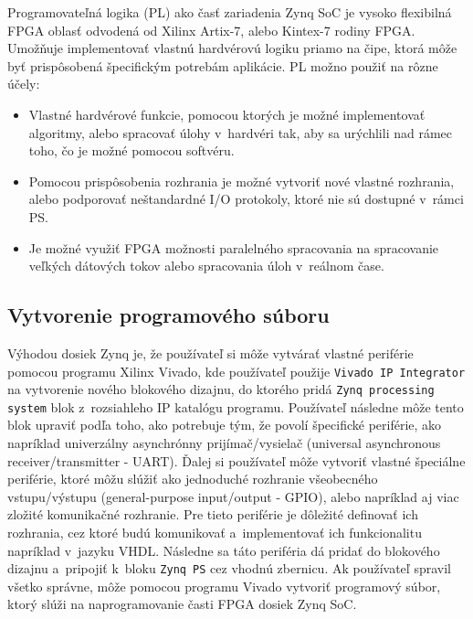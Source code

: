 Programovateľná logika (PL) ako časť zariadenia Zynq SoC je vysoko flexibilná FPGA oblasť odvodená od Xilinx Artix-7, alebo Kintex-7 rodiny FPGA. Umožňuje implementovať vlastnú hardvérovú logiku priamo na čipe, ktorá môže byť prispôsobená špecifickým potrebám aplikácie. PL možno použiť na rôzne účely:

\begin{itemize}
    \item Vlastné hardvérové funkcie, pomocou ktorých je možné implementovať algoritmy, alebo spracovať úlohy v~hardvéri tak, aby sa urýchlili nad rámec toho, čo je možné pomocou softvéru.
    \item Pomocou prispôsobenia rozhrania je možné vytvoriť nové vlastné rozhrania, alebo podporovať neštandardné I/O protokoly, ktoré nie sú dostupné v~rámci PS.
    \item Je možné využiť FPGA možnosti paralelného spracovania na spracovanie veľkých dátových tokov alebo spracovania úloh v~reálnom čase. ~\cite{zynqDoc}
\end{itemize}

\subsection{Vytvorenie programového súboru}

Výhodou dosiek Zynq je, že používateľ si môže vytvárať vlastné periférie pomocou programu Xilinx Vivado, kde používateľ použije \verb|Vivado IP Integrator| na vytvorenie nového blokového dizajnu, do ktorého pridá \verb|Zynq processing system| blok z~rozsiahleho IP katalógu programu. Používateľ následne môže tento blok upraviť podľa toho, ako potrebuje tým, že povolí špecifické periférie, ako napríklad univerzálny asynchrónny prijímač/vysielač (universal asynchronous receiver/transmitter - UART). Ďalej si používateľ môže vytvoriť vlastné špeciálne periférie, ktoré môžu slúžiť ako jednoduché rozhranie všeobecného vstupu/výstupu (general-purpose input/output - GPIO), alebo napríklad aj viac zložité komunikačné rozhranie. Pre tieto periférie je dôležité definovať ich rozhrania, cez ktoré budú komunikovať a~implementovať ich funkcionalitu napríklad v~jazyku VHDL. Následne sa táto periféria dá pridať do blokového dizajnu a~pripojiť k~bloku \verb|Zynq PS| cez vhodnú zbernicu. Ak používateľ spravil všetko správne, môže pomocou programu Vivado vytvoriť programový súbor, ktorý slúži na naprogramovanie časti FPGA dosiek Zynq SoC.~\cite{VivadoProgram, VivadoPeriferia, zynqDoc}

